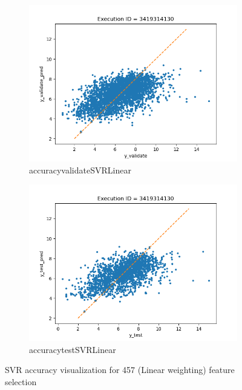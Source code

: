 \documentclass[11pt]{article}
\begin{document}
\begin{figure}
     \centering
     \begin{subfigure}[b]{0.45\textwidth}
         \centering
         \includegraphics[scale=0.45]{images/accuracyvalidateSVRLinear}
         \caption{accuracyvalidateSVRLinear}
        \label{fig:accuracyvalidateSVRLinear}
     \end{subfigure}
     \hfill
     \begin{subfigure}[b]{0.45\textwidth}
         \centering
         \includegraphics[scale=0.45]{images/accuracytestSVRLinear}
        \caption{accuracytestSVRLinear}
        \label{fig:accuracytestSVRLinear}
     \end{subfigure}
     \caption{SVR accuracy visualization for 457 (Linear weighting) feature selection}
     \label{fig:SVRaccuracy}
\end{figure}
\end{document}
